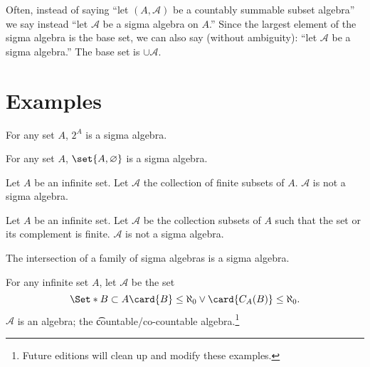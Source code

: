 Often, instead of saying ``let $(A, \mathcal{A} )$ be a countably summable subset algebra'' we say instead ``let $\mathcal{A} $ be a sigma algebra on $A$.''
Since the largest element of the sigma algebra is the base set, we can also say (without ambiguity): ``let $\mathcal{A} $ be a sigma algebra.''
The base set is $\cup \mathcal{A} $.

\section*{Examples}

\begin{example}
For any set $A$, $2^{A}$ is a sigma algebra.
\end{example}

\begin{example}
For any set $A$,
$\set{A, \varnothing}$ is a sigma algebra.
\end{example}

\begin{example}
Let $A$ be an infinite set.
Let $\mathcal{A} $ the collection of finite subsets of $A$.
$\mathcal{A} $ is not a sigma algebra.
\end{example}

\begin{example}
Let $A$ be an infinite set.
Let $\mathcal{A} $ be the collection
subsets of $A$ such that the set or its
complement is finite.
$\mathcal{A} $ is not a sigma algebra.
\end{example}

\begin{proposition}

\label{sigma_algebra:sigmaintersection}The intersection of a family of sigma algebras is a sigma algebra.
\end{proposition}

\begin{example}
For any infinite set $A$, let $\mathcal{A} $ be the set
\[
\Set*{
B \subset A
}{
\card{B} \leq \aleph_0 \lor
\card{C_{A}(B)} \leq \aleph_0
}.
\]
$\mathcal{A} $ is an algebra; the \t{countable/co-countable algebra}.\footnote{Future editions will clean up and modify these examples.}
\end{example}

